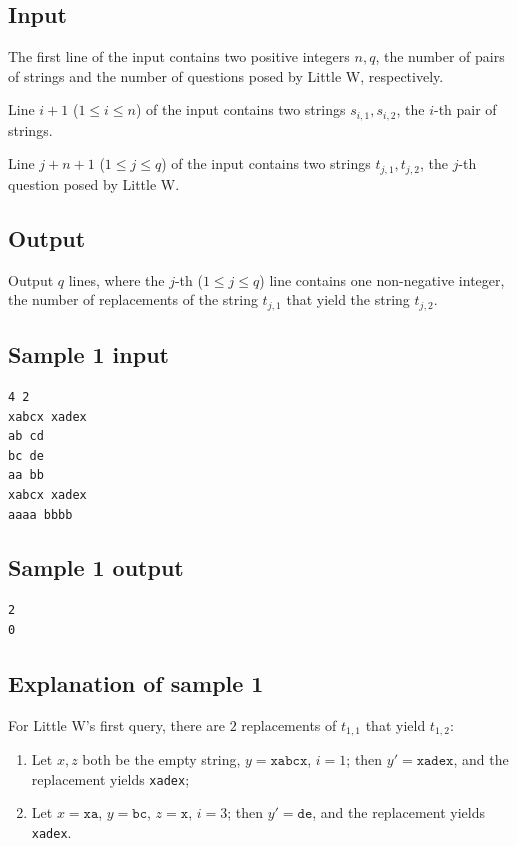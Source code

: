 \documentclass[11pt]{article}
\begin{document}
\subsection*{Input}

The first line of the input contains two positive integers $n, q$, the
number of pairs of strings and the number of questions posed by Little W,
respectively.

Line $i+1$ ($1 \le i \le n$) of the input contains two strings
$s_{i,1}, s_{i,2}$, the $i$-th pair of strings.

Line $j+n+1$ ($1 \le j \le q$) of the input contains two strings
$t_{j,1}, t_{j,2}$, the $j$-th question posed by Little W.

\subsection*{Output}

Output $q$ lines, where the $j$-th ($1 \le j \le q$) line contains one
non-negative integer, the number of replacements of the string $t_{j,1}$
that yield the string $t_{j,2}$.

\subsection*{Sample 1 input}

\begin{verbatim}
4 2
xabcx xadex
ab cd
bc de
aa bb
xabcx xadex
aaaa bbbb
\end{verbatim}

\subsection*{Sample 1 output}

\begin{verbatim}
2
0
\end{verbatim}

\subsection*{Explanation of sample 1}

For Little W's first query, there are $2$ replacements of $t_{1,1}$ that
yield $t_{1,2}$:
\begin{enumerate}
\item Let $x, z$ both be the empty string, $y = \texttt{xabcx}$, $i = 1$;
  then $y' = \texttt{xadex}$, and the replacement yields \texttt{xadex};
\item Let $x = \texttt{xa}$, $y = \texttt{bc}$, $z = \texttt{x}$, $i = 3$;
  then $y' = \texttt{de}$, and the replacement yields \texttt{xadex}.
\end{enumerate}
\end{document}
